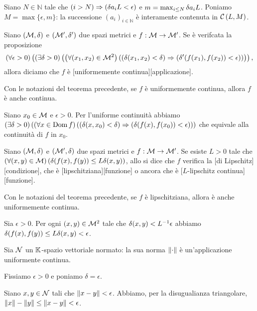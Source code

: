 \par Siano $N \in \mathbb{N}$ tale che $\left ( i > N \right ) \Rightarrow \left ( \delta{a_i}{L} < \epsilon \right )$ e $m = \max_{i \leq N} \delta{a_i}{L}$. Poniamo $M = \max \lbrace \epsilon, m \rbrace$: la successione $(a_i)_{i \in \mathbb{N}}$ \`e interamente contenuta in $\mathcal{C}\left (L,M \right)$. \EndProof
\begin{Definition}
	Siano $(\mathcal{M},\delta)$ e
  $(\mathcal{M}',\delta')$ due spazi metrici e
  $f: \mathcal{M} \rightarrow \mathcal{M}'$.
  Se \`e verifcata la proposizione
  \[
    \left ( \forall \epsilon > 0 \right ) \left ( \left ( \exists \delta > 0 \right ) \left ( \left ( \forall (x_1,x_2) \in \mathcal{M}^2 \right ) \left ( \left ( \delta(x_1,x_2) < \delta \right ) \Rightarrow \left ( \delta'(f(x_1),f(x_2)) < \epsilon \right ) \right ) \right ) \right ),
  \]
  allora diciamo che $f$ \`e
  [uniformemente continua][applicazione].
\end{Definition}
\begin{Theorem}
	Con le notazioni del teorema precedente, se $f$ \`e uniformemente continua, allora $f$ \`e anche continua.
\end{Theorem}
\Proof Siano $x_0 \in \mathcal{M}$ e $\epsilon > 0$. Per l'uniforme continuit\`a abbiamo $\left ( \exists \delta > 0 \right ) \left ( \left ( \forall x \in \operatorname{Dom}{f} \right ) \left ( \left ( \delta(x,x_0) < \delta \right ) \Rightarrow \left ( \delta(f(x),f(x_0)) < \epsilon \right ) \right ) \right )$ che equivale alla continuit\`a di $f$ in $x_0$. \EndProof
\begin{Definition}
	Siano $(\mathcal{M},\delta)$ e $(\mathcal{M}',\delta)$ due spazi metrici e $f: \mathcal{M} \rightarrow \mathcal{M}'$. Se esiste $L > 0$ tale che $\left ( \forall (x,y) \in \mathcal{M} \right ) \left ( \delta(f(x),f(y)) \leq L \delta(x,y) \right )$, allo si dice che $f$ verifica la [di Lipschitz][condizione], che \`e [lipschitziana][funzione] o ancora che \`e [$L$-lipschitz continua][funzione].
\end{Definition}
\begin{Theorem}
	Con le notazioni del teorema precedente, se $f$ \`e lipschitziana, allora \`e anche uniformemente continua.
\end{Theorem}
\Proof Sia $\epsilon > 0$. Per ogni $(x,y) \in \mathcal{M}^2$ tale che $\delta(x,y) < L^{-1} \epsilon$ abbiamo $\delta(f(x),f(y)) \leq L \delta(x,y) < \epsilon$. \EndProof
\begin{Theorem}
  Sia $\mathcal{N}$ un $\mathbb{K}$-spazio vettoriale normato: la sua norma
  $\Norm{\cdot}$ \`e un'applicazione uniformente continua.
\end{Theorem}
\Proof Fissiamo $\epsilon > 0$ e poniamo $\delta = \epsilon$.
\par Siano $x, y \in \mathcal{N}$ tali che
$\Norm{x - y} < \epsilon$.
Abbiamo, per la disugualianza triangolare,
$\Norm{x} - \Norm{y} \leq \Norm{x - y} < \epsilon$. \EndProof
